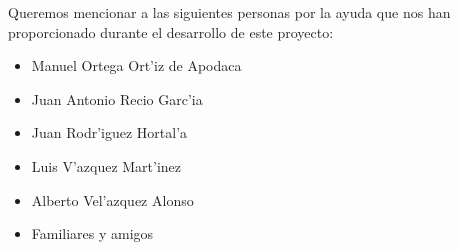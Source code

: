 Queremos mencionar a las siguientes personas por la ayuda que nos han proporcionado durante el desarrollo de este proyecto:
\begin{itemize}
\item Manuel Ortega Ort'iz de Apodaca
\item Juan Antonio Recio Garc'ia
\item Juan Rodr'iguez Hortal'a
\item Luis V'azquez  Mart'inez
\item Alberto Vel'azquez Alonso
\item Familiares y amigos
\end{itemize}